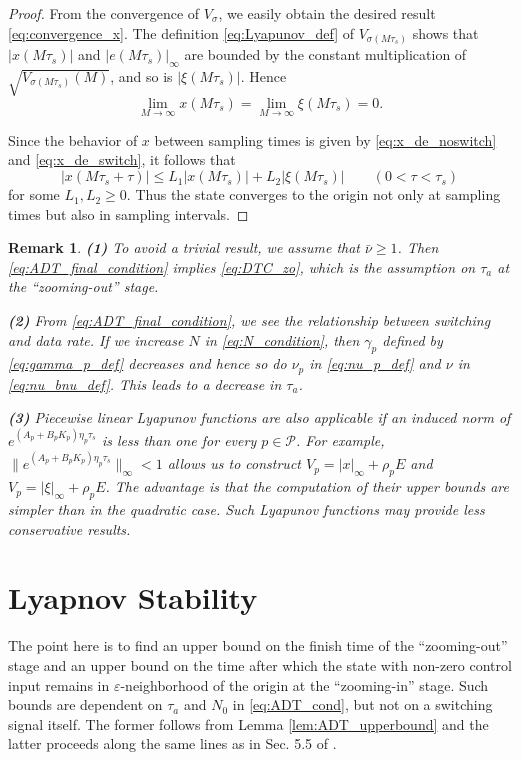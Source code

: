 \documentclass[letterpaper, 11pt, onecolumn]{ieeeconf}  \IEEEoverridecommandlockouts
\newtheorem{remark}[theorem]{Remark}
\begin{document}
\begin{proof}
From the convergence of $V_{\sigma}$, 
we easily obtain the desired result \eqref{eq:convergence_x}.
The definition \eqref{eq:Lyapunov_def} of $V_{\sigma(M\tau_s)}$ shows that
$| x(M\tau_s)|$ and $|e(M\tau_s)|_{\infty}$ are bounded by the constant multiplication
of $\sqrt{V_{\sigma(M\tau_s)}(M)}$, and so is $|\xi(M\tau_s)|$.
Hence 
\begin{equation*}
\lim_{M\to \infty}x(M\tau_s) = \lim_{M\to \infty}\xi(M\tau_s) =
0.
\end{equation*}

Since the behavior of $x$ between sampling times is given by
\eqref{eq:x_de_noswitch} and \eqref{eq:x_de_switch},
it follows that
\begin{equation*}
|x(M\tau_s + \tau)| \leq L_1 |x(M\tau_s)|
+ L_2 |\xi(M\tau_s)|
\qquad (0 <  \tau < \tau_s)
\end{equation*}
for some $L_1,L_2 \geq 0$.
Thus the state converges to the origin not only at sampling times
but also in sampling intervals.
\end{proof}


\begin{remark}
{\bf(1)}
To avoid a trivial result, we assume that $\bar \nu \geq 1$. 
Then 
\eqref{eq:ADT_final_condition} implies
\eqref{eq:DTC_zo}, which is the assumption on $\tau_a$ 
at the ``zooming-out'' stage.

\noindent
{\bf(2)}
From \eqref{eq:ADT_final_condition}, we see the relationship between
switching and data rate.
If we increase $N$ in \eqref{eq:N_condition}, 
then $\gamma_p$ defined by \eqref{eq:gamma_p_def}
decreases and hence so do $\nu_p$ in \eqref{eq:nu_p_def}
and $\nu$ in \eqref{eq:nu_bnu_def}.
This leads to a decrease in $\tau_a$. 


\noindent
{\bf (3)}
Piecewise linear Lyapunov functions are also applicable
if an induced norm of $e^{(A_p + B_pK_p)\eta_p \tau_s}$ is less than one
for every $p \in \mathcal{P}$.
For example,
$\|e^{(A_p + B_pK_p)\eta_p \tau_s}\|_{\infty} < 1$ allows us to construct
$V_p = |x|_{\infty} + \rho_pE$ and $V_p = |\xi|_{\infty} + \rho_pE$.
The advantage is that the computation of their upper bounds
are simpler than in
the quadratic case. Such Lyapunov functions may provide less conservative results.
\end{remark}

\section{Lyapnov Stability}
The point here is to find an upper bound on the
finish time of the ``zooming-out'' stage and
an upper bound on the time after which the state with non-zero control input remains in 
$\varepsilon$-neighborhood of the origin at the ``zooming-in'' stage.
Such bounds are dependent on $\tau_a$ and $N_0$ in \eqref{eq:ADT_cond}, 
but not on a switching signal itself.
The former follows from Lemma \ref{lem:ADT_upperbound}  and
the latter proceeds along the
same lines as in Sec. 5.5 of \cite{Liberzon2014}.
\end{document}
